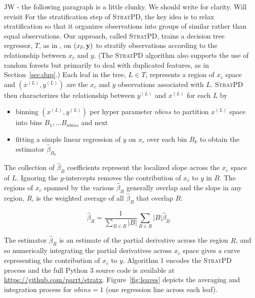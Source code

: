 \documentclass[12pt]{article}
\newcommand{\secref}[1]{Section~\ref{#1}}
\newcommand{\figref}[1]{Figure~\ref{#1}}
\newcommand{\spd}{\fontfamily{cmr}\textsc{\small StratPD}}
\newcommand{\xnc}{$x_{\overline{c}}$}
\begin{document}
{\color{red} JW - the following paragraph is a little clunky. We should write for clarity. Will revisit}
For the stratification step of \spd{}, the key idea is to relax stratification so that it organizes observations into groups of similar rather than equal observations. Our approach, called \spd, trains a decision tree regressor, $T$, as in \cite{CART}, on $(x_{\overline{c}}, {\bf y})$ to stratify observations according to the relationship between \xnc{} and $y$.  (The \spd{} algorithm also supports the use of random forests \cite{RF} but primarily to deal with duplicated features, as in \secref{sec:dup}.)  Each leaf in the tree, $L \in T$, represents a region of \xnc{} space and $(x^{(L)}, y^{(L)})$ are the $x_c$ and $y$ observations associated with $L$. \spd{} then characterizes the relationship between $y^{(L)}$ and $x^{(L)}$ for each $L$ by 
\begin{itemize}
	\item binning $(x^{(L)}, y^{(L)})$ per hyper parameter $nbins$ to partition $x^{(L)}$ space into bins $B_1, \ldots B_{nbins}$ and next
	\item fitting a simple linear regression of $y$ on $x_c$ over each bin $B_k$ to obtain the estimator $\widehat{\beta}_{B_k}$
\end{itemize}

The collection of $\widehat{\beta}_{B}$ coefficients represent the localized slope across the $x_c$ space of $L$. Ignoring the $y$-intercepts removes the contribution of \xnc{} to $y$ in $B$. The regions of $x_c$ spanned by the various $\widehat{\beta}_{B}$ generally overlap and the slope in any region, $R$, is the weighted average of all $\widehat{\beta}_{B}$ that overlap $R$:

\begin{equation}\label{eq:slope}
\widehat{\beta}_R = \frac{1}{\displaystyle\sum_{B \in R} |B|}\displaystyle\sum_{B \in R}|B|\widehat{\beta}_{B}
\end{equation}

The estimator $\widehat{\beta}_R$ is an estimate of the partial derivative across the region $R$, and so numerically integrating the partial derivatives across $x_c$ space gives a curve representing the contribution of $x_c$ to $y$.  Algorithm 1 encodes the \spd{} process and the full Python 3 source code is available at {\small \url{https://github.com/parrt/stratx}}. \figref{fig:leaves} depicts the averaging and integration process for $nbins=1$ (one regression line across each leaf).  
\end{document}
